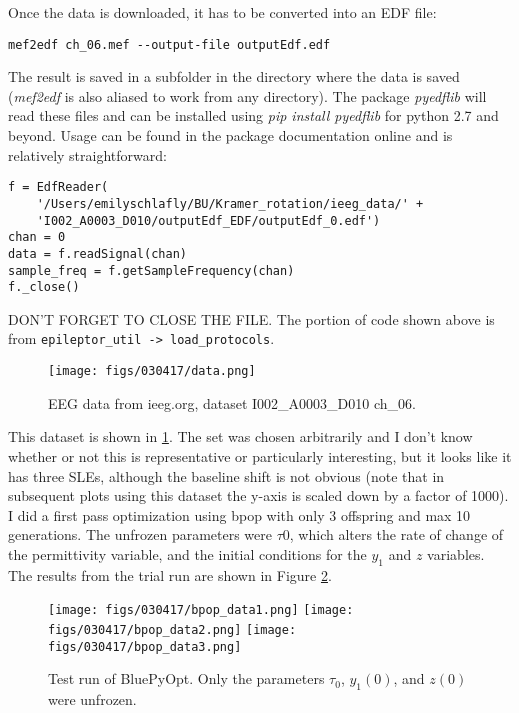 \documentclass[11pt]{article}
\begin{document}
	 	Once the data is downloaded, it has to be converted into an EDF file:
	 	\begin{lstlisting}
mef2edf ch_06.mef --output-file outputEdf.edf
		\end{lstlisting}
		The result is saved in a subfolder in the directory where the data is saved (\textit{mef2edf} is also aliased to work from any directory). The package \textit{pyedflib} will read these files and can be installed using \textit{pip install pyedflib} for python 2.7 and beyond. Usage can be found in the package documentation online and is relatively straightforward:
		\begin{lstlisting}
f = EdfReader(
    '/Users/emilyschlafly/BU/Kramer_rotation/ieeg_data/' +
    'I002_A0003_D010/outputEdf_EDF/outputEdf_0.edf')
chan = 0
data = f.readSignal(chan)
sample_freq = f.getSampleFrequency(chan) 
f._close()
		\end{lstlisting}
		DON'T FORGET TO CLOSE THE FILE. The portion of code shown above is from \verb|epileptor_util -> load_protocols|. 

		\begin{figure}[htbp]
			\centering
			\texttt{[image: figs/030417/data.png]}
			\caption{EEG data from ieeg.org, dataset I002\_A0003\_D010 ch\_06.}
			\label{fig:first_data}
		\end{figure}

		This dataset is shown in \ref{fig:first_data}. The set was chosen arbitrarily and I don't know whether or not this is representative or particularly interesting, but it looks like it has three SLEs, although the baseline shift is not obvious (note that in subsequent plots using this dataset the y-axis is scaled down by a factor of 1000). I did a first pass optimization using bpop with only 3 offspring and max 10 generations. The unfrozen parameters were $\tau{0}$, which alters the rate of change of the permittivity variable, and the initial conditions for the $y_{1}$ and $z$ variables. The results from the trial run are shown in Figure \ref{fig:bpop_first_data}.

		\begin{figure}[htbp]
			\centering
			\texttt{[image: figs/030417/bpop\_data1.png]}
			\texttt{[image: figs/030417/bpop\_data2.png]}
			\texttt{[image: figs/030417/bpop\_data3.png]}
			\caption{Test run of BluePyOpt. Only the parameters $\tau_{0}$, $y_{1}(0)$, and $z(0)$ were unfrozen.}
			\label{fig:bpop_first_data}
		\end{figure}
\end{document}
